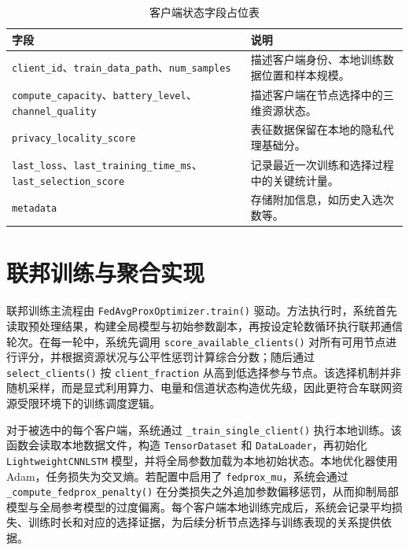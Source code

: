 \begin{table}[htbp]
    \centering
    \caption{客户端状态字段占位表}
    \label{tab:client-state-placeholder}
    \begin{tabular}{p{3.4cm}p{8.8cm}}
        \toprule
        字段 & 说明 \\
        \midrule
        \texttt{client\_id}、\texttt{train\_data\_path}、\texttt{num\_samples} & 描述客户端身份、本地训练数据位置和样本规模。 \\
        \texttt{compute\_capacity}、\texttt{battery\_level}、\texttt{channel\_quality} & 描述客户端在节点选择中的三维资源状态。 \\
        \texttt{privacy\_locality\_score} & 表征数据保留在本地的隐私代理基础分。 \\
        \texttt{last\_loss}、\texttt{last\_training\_time\_ms}、\texttt{last\_selection\_score} & 记录最近一次训练和选择过程中的关键统计量。 \\
        \texttt{metadata} & 存储附加信息，如历史入选次数等。 \\
        \bottomrule
    \end{tabular}
\end{table}

\section{联邦训练与聚合实现}
\label{sec:implementation-federated-training}

联邦训练主流程由 \texttt{FedAvgProxOptimizer.train()} 驱动。方法执行时，系统首先读取预处理结果，构建全局模型与初始参数副本，再按设定轮数循环执行联邦通信轮次。在每一轮中，系统先调用 \texttt{score\_available\_clients()} 对所有可用节点进行评分，并根据资源状况与公平性惩罚计算综合分数；随后通过 \texttt{select\_clients()} 按 \texttt{client\_fraction} 从高到低选择参与节点。该选择机制并非随机采样，而是显式利用算力、电量和信道状态构造优先级，因此更符合车联网资源受限环境下的训练调度逻辑。

对于被选中的每个客户端，系统通过 \texttt{\_train\_single\_client()} 执行本地训练。该函数会读取本地数据文件，构造 \texttt{TensorDataset} 和 \texttt{DataLoader}，再初始化 \texttt{LightweightCNNLSTM} 模型，并将全局参数加载为本地初始状态。本地优化器使用 Adam，任务损失为交叉熵。若配置中启用了 \texttt{fedprox\_mu}，系统会通过 \texttt{\_compute\_fedprox\_penalty()} 在分类损失之外追加参数偏移惩罚，从而抑制局部模型与全局参考模型的过度偏离。每个客户端本地训练完成后，系统会记录平均损失、训练时长和对应的选择证据，为后续分析节点选择与训练表现的关系提供依据。

